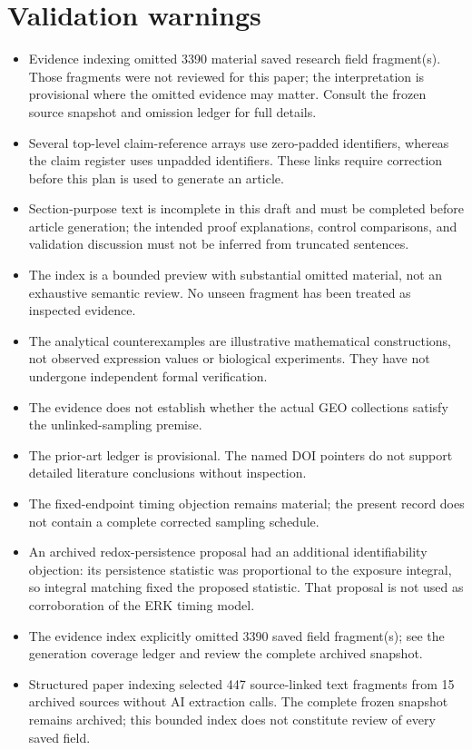 \documentclass[11pt]{article}
\begin{document}
\section*{Validation warnings}
\begin{itemize}
\item Evidence indexing omitted 3390 material saved research field fragment(s). Those fragments were not reviewed for this paper; the interpretation is provisional where the omitted evidence may matter. Consult the frozen source snapshot and omission ledger for full details.
\item Several top-level claim-reference arrays use zero-padded identifiers, whereas the claim register uses unpadded identifiers. These links require correction before this plan is used to generate an article.
\item Section-purpose text is incomplete in this draft and must be completed before article generation; the intended proof explanations, control comparisons, and validation discussion must not be inferred from truncated sentences.
\item The index is a bounded preview with substantial omitted material, not an exhaustive semantic review. No unseen fragment has been treated as inspected evidence.
\item The analytical counterexamples are illustrative mathematical constructions, not observed expression values or biological experiments. They have not undergone independent formal verification.
\item The evidence does not establish whether the actual GEO collections satisfy the unlinked-sampling premise.
\item The prior-art ledger is provisional. The named DOI pointers do not support detailed literature conclusions without inspection.
\item The fixed-endpoint timing objection remains material; the present record does not contain a complete corrected sampling schedule.
\item An archived redox-persistence proposal had an additional identifiability objection: its persistence statistic was proportional to the exposure integral, so integral matching fixed the proposed statistic. That proposal is not used as corroboration of the ERK timing model.
\item The evidence index explicitly omitted 3390 saved field fragment(s); see the generation coverage ledger and review the complete archived snapshot.
\item Structured paper indexing selected 447 source-linked text fragments from 15 archived sources without AI extraction calls. The complete frozen snapshot remains archived; this bounded index does not constitute review of every saved field.

\end{itemize}
\end{document}
